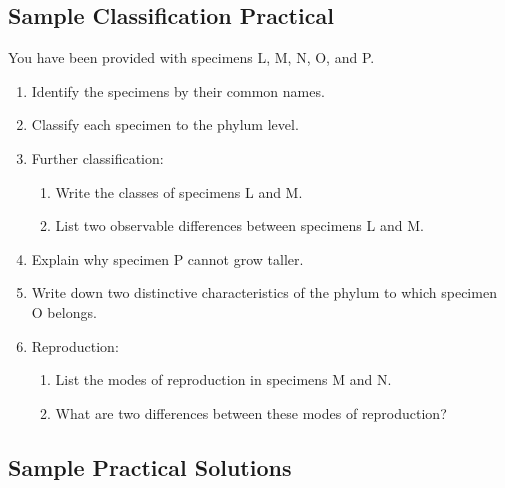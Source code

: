 \subsection{Sample Classification Practical}

You have been provided with specimens L, M, N, O, and P.
\begin{enumerate}
\item{Identify the specimens by their common names.}
\item{Classify each specimen to the phylum level.}	
\item{Further classification:
\begin{enumerate}
\item{Write the classes of specimens L and M.}
\item{List two observable differences between specimens L and M.}
\end{enumerate}
}%
\item{Explain why specimen P cannot grow taller.}
\item{Write down two distinctive characteristics of the phylum to which specimen O belongs.}
\item{Reproduction:
\begin{enumerate}
\item{List the modes of reproduction in specimens M and N.}
\item{What are two differences between these modes of reproduction?}
\end{enumerate}
}%
\end{enumerate}

\subsection{Sample Practical Solutions}

